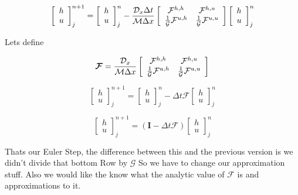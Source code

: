 \documentclass[12pt]{article}
\begin{document}
\[\left[\begin{array}{c}
h \\ u
\end{array}\right]^{n+1}_j = \left[\begin{array}{c}
h \\ u
\end{array}\right]^{n}_j - \frac{\mathcal{D}_x\Delta t}{\mathcal{M}\Delta x}\left[\begin{array}{c c}
\mathcal{F}^{h,h} & \mathcal{F}^{h,u} \\ \frac{1}{\mathcal{G}}\mathcal{F}^{u,h} &  \frac{1}{\mathcal{G}}\mathcal{F}^{u,u} 
\end{array}\right]\left[\begin{array}{c}
h \\ u
\end{array}\right]^{n}_j  \]

Lets define

\[\boldsymbol{\mathcal{F}} = \frac{\mathcal{D}_x}{\mathcal{M}\Delta x}\left[\begin{array}{c c}
\mathcal{F}^{h,h} & \mathcal{F}^{h,u} \\ \frac{1}{\mathcal{G}}\mathcal{F}^{u,h} &  \frac{1}{\mathcal{G}}\mathcal{F}^{u,u} 
\end{array}\right] \]

\[\left[\begin{array}{c}
h \\ u
\end{array}\right]^{n+1}_j = \left[\begin{array}{c}
h \\ u
\end{array}\right]^{n}_j - \Delta t\boldsymbol{\mathcal{F}}\left[\begin{array}{c}
h \\ u
\end{array}\right]^{n}_j  \]

\[\left[\begin{array}{c}
h \\ u
\end{array}\right]^{n+1}_j = \left(\boldsymbol{I} - \Delta t\boldsymbol{\mathcal{F}} \right)\left[\begin{array}{c}
h \\ u
\end{array}\right]^{n}_j  \]

Thats our Euler Step, the difference between this and the previous version is we didn't divide that bottom Row by $\mathcal{G}$ So we have to change our approximation stuff. Also we would like the know what the analytic value of $\boldsymbol{\mathcal{F}}$ is and approximations to it. 
\end{document}
